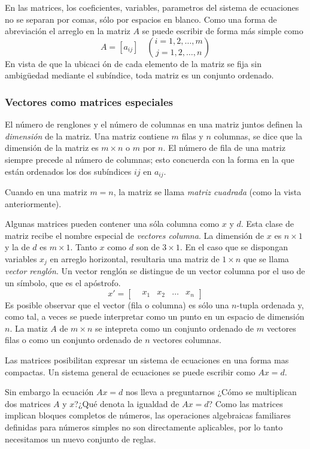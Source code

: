 En las matrices, los coeficientes, variables, parametros del sistema de ecuaciones no se separan por comas, sólo por espacios en blanco. Como una forma de abreviación el arreglo en la matriz \(A\) se puede escribir de forma más simple como 
\[
A = [a_{ij}] \quad \binom{i = 1, 2, \dots, m}{j = 1, 2, \dots, n} 
\]
En vista de que la ubicaci ón de cada elemento de la matriz se fija sin ambigüedad mediante el subíndice, toda matriz es un conjunto ordenado.


\subsubsection{Vectores como matrices especiales}

El número de renglones y el número de columnas en una matriz juntos definen la \textit{dimensión} de la matriz. Una matriz contiene \(m\) filas y \(n\) columnas, se dice que la dimensión de la matriz es \(m \times n\) o \(m\) por \(n\). El número de fila de una matriz siempre precede al número de columnas; esto concuerda con la forma en la que están ordenados los dos subíndices \(ij\) en \(a_{ij}\).

Cuando en una matriz \(m = n\), la matriz se llama \textit{matriz cuadrada} (como la vista anteriormente).

Algunas matrices pueden contener una sóla columna como \(x\) y \(d\). Esta clase de matriz recibe el nombre especial de \textit{vectores columna}. La dimensión de \(x\) es \(n \times 1\) y la de \(d\) es \(m \times 1\). Tanto \(x\) como \(d\) son de \(3 \times 1\). En el caso que se dispongan variables \(x_j\) en arreglo horizontal, resultaria una matriz de \(1 \times n\) que se llama \textit{vector renglón}. Un vector renglón se distingue de un vector columna por el uso de un símbolo, que es el apóstrofo.
\[
x' = \begin{bmatrix}
    & x_1 & x_2 & \dots & x_n
\end{bmatrix}
\]
Es posible observar que el vector (fila o columna) es sólo una \(n\)-tupla ordenada y, como tal, a veces se puede interpretar como un punto en un espacio de dimensión \(n\). La matiz \(A\) de \(m \times n\) se intepreta como un conjunto ordenado de \(m\) vectores filas o como un conjunto ordenado de \(n\) vectores columnas.

Las matrices posibilitan expresar un sistema de ecuaciones en una forma mas compactas. Un sistema general de ecuaciones se puede escribir como \(Ax = d\).

Sin embargo la ecuación \(Ax = d\) nos lleva a preguntarnos ¿Cómo se multiplican dos matrices \(A\) y \(x\)?¿Qué denota la igualdad de \(Ax=d\)? Como las matrices implican bloques completos de números, las operaciones algebraicas familiares definidas para números simples no son directamente aplicables, por lo tanto necesitamos un nuevo conjunto de reglas.

